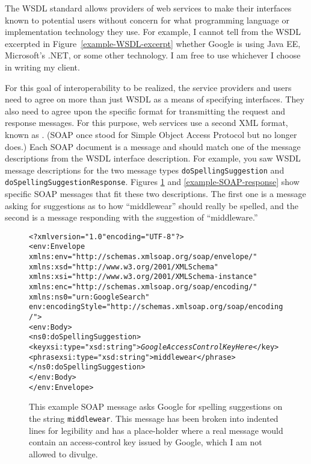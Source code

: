 The WSDL standard allows providers of web services to make their
interfaces known to potential users without concern for what
programming language or implementation technology they use.  For
example, I cannot tell from the WSDL excerpted in
Figure~\ref{example-WSDL-excerpt} whether Google is using
Java EE, Microsoft's .NET, or some other technology.  I am free to use
whichever I choose in writing my client.

For this goal of interoperability to be realized, the service
providers and users need to agree on more than just WSDL as a means of
specifying interfaces.  They also need to agree upon the specific
format for transmitting the request and response messages.  For this
purpose, web services use a second XML format, known as .
(SOAP once stood for Simple Object Access Protocol but no longer does.)
Each SOAP document is a
message and should match one of the message descriptions from the
WSDL interface description.  For example, you saw WSDL message
descriptions for the two message types \verb|doSpellingSuggestion| and
\verb|doSpellingSuggestionResponse|.  Figures
\ref{example-SOAP-request} and \ref{example-SOAP-response} show
specific SOAP messages that fit these two descriptions.  The first one
is a message asking for suggestions as to how ``middlewear'' should
really be spelled, and the second is a message responding with the
suggestion of ``middleware.''
\begin{figure}
\begin{alltt}
<?xml version="1.0" encoding="UTF-8"?>
<env:Envelope
 xmlns:env="http://schemas.xmlsoap.org/soap/envelope/"
 xmlns:xsd="http://www.w3.org/2001/XMLSchema"
 xmlns:xsi="http://www.w3.org/2001/XMLSchema-instance"
 xmlns:enc="http://schemas.xmlsoap.org/soap/encoding/"
 xmlns:ns0="urn:GoogleSearch"
 env:encodingStyle="http://schemas.xmlsoap.org/soap/encoding/">
  <env:Body>
    <ns0:doSpellingSuggestion>
      <key xsi:type="xsd:string">\textrm{\textit{GoogleAccessControlKeyHere}}</key>
      <phrase xsi:type="xsd:string">middlewear</phrase>
    </ns0:doSpellingSuggestion>
  </env:Body>
</env:Envelope>
\end{alltt}
\caption{This example SOAP message asks Google for spelling suggestions
on the string {\tt middlewear}. This message has been broken into indented lines
for legibility and has a place-holder where a real message would contain an
access-control key issued by Google, which I am not allowed to divulge.}\label{example-SOAP-request}
\end{figure}
